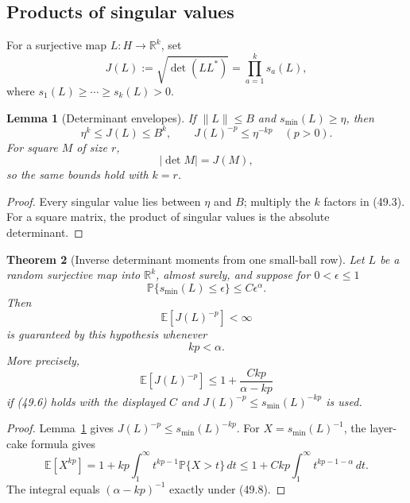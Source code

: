 \documentclass[11pt]{article}
\newtheorem{theorem}{Theorem}[section]
\newtheorem{lemma}[theorem]{Lemma}
\begin{document}
\subsection{Products of singular values}

For a surjective map \(L:H\to\mathbb R^k\), set
\[
                       J(L):=\sqrt{\det(LL^*)}
                             =\prod_{a=1}^k s_a(L),            \tag{49.3}
\]
where \(s_1(L)\ge\cdots\ge s_k(L)>0\).

\begin{lemma}[Determinant envelopes]
\label{lem:v11v49-envelope}
If \(\lVert L\rVert\le B\) and \(s_{\min}(L)\ge\eta\), then
\[
                  \eta^k\le J(L)\le B^k,\qquad
                  J(L)^{-p}\le\eta^{-kp}\quad(p>0).           \tag{49.4}
\]
For square \(M\) of size \(r\),
\[
                  |\det M|=J(M),                              \tag{49.5}
\]
so the same bounds hold with \(k=r\).
\end{lemma}

\begin{proof}
Every singular value lies between \(\eta\) and \(B\); multiply the
\(k\) factors in (49.3).  For a square matrix, the product of singular
values is the absolute determinant.
\end{proof}

\begin{theorem}[Inverse determinant moments from one small-ball row]
\label{thm:v11v49-inverse-moment}
Let \(L\) be a random surjective map into \(\mathbb R^k\), almost
surely, and suppose for \(0<\epsilon\le1\)
\[
              \mathbb P\{s_{\min}(L)\le\epsilon\}
                         \le C\epsilon^\alpha.                 \tag{49.6}
\]
Then
\[
                      \mathbb E[J(L)^{-p}]<\infty             \tag{49.7}
\]
is guaranteed by this hypothesis whenever
\[
                               kp<\alpha.                      \tag{49.8}
\]
More precisely,
\[
 \mathbb E[J(L)^{-p}]
 \le 1+\frac{Ckp}{\alpha-kp}                                  \tag{49.9}
\]
if (49.6) holds with the displayed \(C\) and
\(J(L)^{-p}\le s_{\min}(L)^{-kp}\) is used.
\end{theorem}

\begin{proof}
Lemma~\ref{lem:v11v49-envelope} gives
\(J(L)^{-p}\le s_{\min}(L)^{-kp}\).  For
\(X=s_{\min}(L)^{-1}\), the layer-cake formula gives
\[
 \mathbb E[X^{kp}]
 =1+kp\int_1^\infty t^{kp-1}\mathbb P\{X>t\}\,dt
 \le1+Ckp\int_1^\infty t^{kp-1-\alpha}\,dt.                  \tag{49.10}
\]
The integral equals \((\alpha-kp)^{-1}\) exactly under (49.8).
\end{proof}
\end{document}
